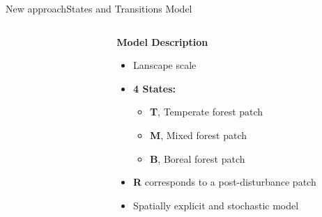 \documentclass[10pt,aspectratio=149]{beamer}
\begin{document}
\begin{frame}{New approach}{States and Transitions Model}

\begin{columns}[t]
	\begin{column}[t]{.40\paperwidth}
		\begin{figure}
			\small{}
		\end{figure}
	\end{column}
	\begin{column}[t]{.50\paperwidth}
	\textbf{Model Description}
		\begin{itemize}
			\item Lanscape scale
			\item \textbf{4 States:}
			\begin{itemize}
				\item \textcolor{Temperate}{\textbf{T}}, Temperate forest patch
				\item \textcolor{Mixed}{\textbf{M}}, Mixed forest patch
				\item \textcolor{Boreal}{\textbf{B}}, Boreal forest patch
			\end{itemize}
			\item \textcolor{Regeneration}{\textbf{R}} corresponds to a post-disturbance patch
			\item Spatially explicit and stochastic model
		\end{itemize}
	\end{column}
\end{columns}
\end{frame}

\end{document}
